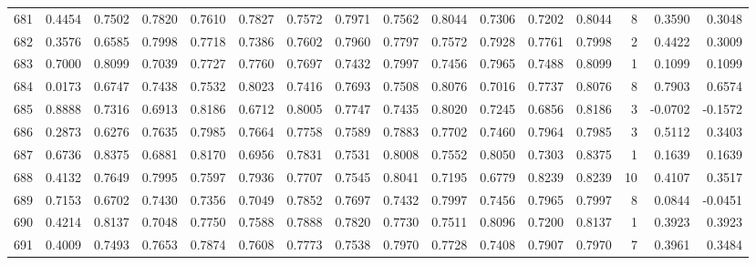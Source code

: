 \begin{tabular}{lrrrrrrrrrrrrrrr}
681 &      0.4454 &  0.7502 &  0.7820 &  0.7610 &  0.7827 &  0.7572 &  0.7971 &  0.7562 &  0.8044 &  0.7306 &   0.7202 &     0.8044 &      8 &                    0.3590 &                     0.3048 \\
682 &      0.3576 &  0.6585 &  0.7998 &  0.7718 &  0.7386 &  0.7602 &  0.7960 &  0.7797 &  0.7572 &  0.7928 &   0.7761 &     0.7998 &      2 &                    0.4422 &                     0.3009 \\
683 &      0.7000 &  0.8099 &  0.7039 &  0.7727 &  0.7760 &  0.7697 &  0.7432 &  0.7997 &  0.7456 &  0.7965 &   0.7488 &     0.8099 &      1 &                    0.1099 &                     0.1099 \\
684 &      0.0173 &  0.6747 &  0.7438 &  0.7532 &  0.8023 &  0.7416 &  0.7693 &  0.7508 &  0.8076 &  0.7016 &   0.7737 &     0.8076 &      8 &                    0.7903 &                     0.6574 \\
685 &      0.8888 &  0.7316 &  0.6913 &  0.8186 &  0.6712 &  0.8005 &  0.7747 &  0.7435 &  0.8020 &  0.7245 &   0.6856 &     0.8186 &      3 &                   -0.0702 &                    -0.1572 \\
686 &      0.2873 &  0.6276 &  0.7635 &  0.7985 &  0.7664 &  0.7758 &  0.7589 &  0.7883 &  0.7702 &  0.7460 &   0.7964 &     0.7985 &      3 &                    0.5112 &                     0.3403 \\
687 &      0.6736 &  0.8375 &  0.6881 &  0.8170 &  0.6956 &  0.7831 &  0.7531 &  0.8008 &  0.7552 &  0.8050 &   0.7303 &     0.8375 &      1 &                    0.1639 &                     0.1639 \\
688 &      0.4132 &  0.7649 &  0.7995 &  0.7597 &  0.7936 &  0.7707 &  0.7545 &  0.8041 &  0.7195 &  0.6779 &   0.8239 &     0.8239 &     10 &                    0.4107 &                     0.3517 \\
689 &      0.7153 &  0.6702 &  0.7430 &  0.7356 &  0.7049 &  0.7852 &  0.7697 &  0.7432 &  0.7997 &  0.7456 &   0.7965 &     0.7997 &      8 &                    0.0844 &                    -0.0451 \\
690 &      0.4214 &  0.8137 &  0.7048 &  0.7750 &  0.7588 &  0.7888 &  0.7820 &  0.7730 &  0.7511 &  0.8096 &   0.7200 &     0.8137 &      1 &                    0.3923 &                     0.3923 \\
691 &      0.4009 &  0.7493 &  0.7653 &  0.7874 &  0.7608 &  0.7773 &  0.7538 &  0.7970 &  0.7728 &  0.7408 &   0.7907 &     0.7970 &      7 &                    0.3961 &                     0.3484 \\

\end{tabular}
